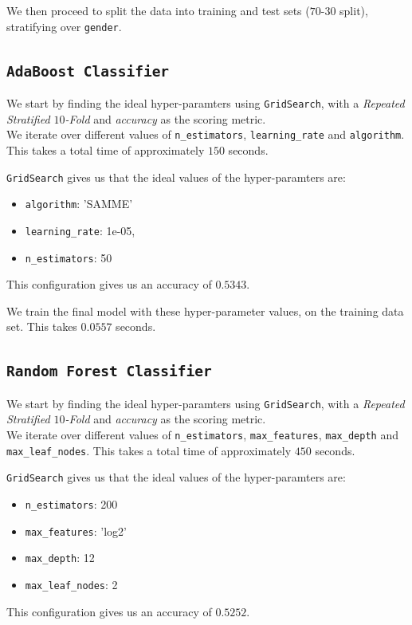 \documentclass{article}
\begin{document}
    We then proceed to split the data into training and test sets ($70$-$30$ split), stratifying over \verb|gender|.

\subsection{\texttt{AdaBoost Classifier}}
    We start by finding the ideal hyper-paramters using \verb|GridSearch|, with a \textit{Repeated Stratified $10$-Fold} and \textit{accuracy} as the scoring metric. \\
    We iterate over different values of \verb|n_estimators|, \verb|learning_rate| and \verb|algorithm|. This takes a total time of approximately $150$ seconds.

    \verb|GridSearch| gives us that the ideal values of the hyper-paramters are:
    \begin{itemize}
        \item \verb|algorithm|: 'SAMME'
        \item \verb|learning_rate|: 1e-05,
        \item \verb|n_estimators|: 50
    \end{itemize}
    This configuration gives us an accuracy of $0.5343$.

    We train the final model with these hyper-parameter values, on the training data set. This takes $0.0557$ seconds.

\subsection{\texttt{Random Forest Classifier}}
    We start by finding the ideal hyper-paramters using \verb|GridSearch|, with a \textit{Repeated Stratified $10$-Fold} and \textit{accuracy} as the scoring metric. \\
    We iterate over different values of \verb|n_estimators|, \verb|max_features|, \verb|max_depth| and \verb|max_leaf_nodes|. This takes a total time of approximately $450$ seconds.

    \verb|GridSearch| gives us that the ideal values of the hyper-paramters are:
    \begin{itemize}
        \item \verb|n_estimators|: 200
        \item \verb|max_features|: 'log2'
        \item \verb|max_depth|: 12
        \item \verb|max_leaf_nodes|: 2
    \end{itemize}
    This configuration gives us an accuracy of $0.5252$.
\end{document}
